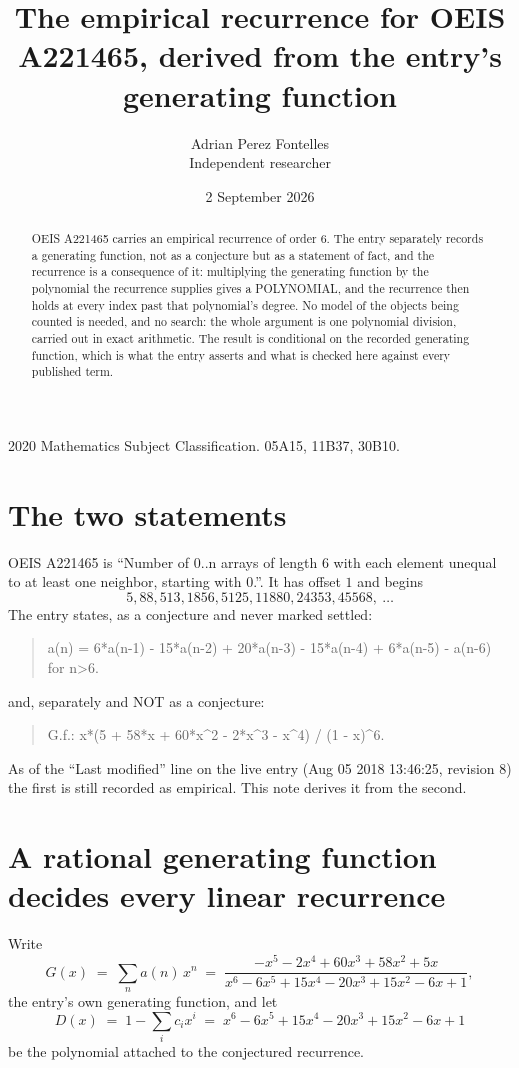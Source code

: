 \documentclass[11pt,a4paper]{article}
\title{The empirical recurrence for OEIS A221465, derived from the entry's generating function}
\author{Adrian Perez Fontelles\\ \small Independent researcher}
\date{2 September 2026}
\theoremstyle{plain}
\theoremstyle{definition}
\begin{document}
\maketitle

\begin{abstract}
OEIS A221465 carries an empirical recurrence of order $6$. The entry separately records a
generating function, not as a conjecture but as a statement of fact, and the recurrence is a
consequence of it: multiplying the generating function by the polynomial the recurrence
supplies gives a POLYNOMIAL, and the recurrence then holds at every index past that
polynomial's degree. No model of the objects being counted is needed, and no search: the
whole argument is one polynomial division, carried out in exact arithmetic. The result is
conditional on the recorded generating function, which is what the entry asserts and what is
checked here against every published term.
\end{abstract}

\noindent\small 2020 Mathematics Subject Classification. 05A15, 11B37, 30B10.\normalsize

\section{The two statements}

OEIS A221465 is ``Number of 0..n arrays of length 6 with each element unequal to at least one neighbor, starting with 0.''. It has offset $1$ and begins
\[
5, 88, 513, 1856, 5125, 11880, 24353, 45568,\ \dots
\]
The entry states, as a conjecture and never marked settled:
\begin{quote}
a(n) = 6*a(n-1) - 15*a(n-2) + 20*a(n-3) - 15*a(n-4) + 6*a(n-5) - a(n-6) for n>6.
\end{quote}
and, separately and NOT as a conjecture:
\begin{quote}
G.f.: x*(5 + 58*x + 60*x\^{}2 - 2*x\^{}3 - x\^{}4) / (1 - x)\^{}6.
\end{quote}
As of the ``Last modified'' line on the live entry (Aug 05 2018 13:46:25, revision 8) the first is still
recorded as empirical. This note derives it from the second.

\section{A rational generating function decides every linear recurrence}

Write
\[
G(x)\;=\;\sum_{n}a(n)\,x^{n}\;=\;\frac{- x^{5} - 2 x^{4} + 60 x^{3} + 58 x^{2} + 5 x}{x^{6} - 6 x^{5} + 15 x^{4} - 20 x^{3} + 15 x^{2} - 6 x + 1},
\]
the entry's own generating function, and let
\[
D(x)\;=\;1-\sum_i c_i x^{i}\;=\;x^{6} - 6 x^{5} + 15 x^{4} - 20 x^{3} + 15 x^{2} - 6 x + 1
\]
be the polynomial attached to the conjectured recurrence.
\end{document}
